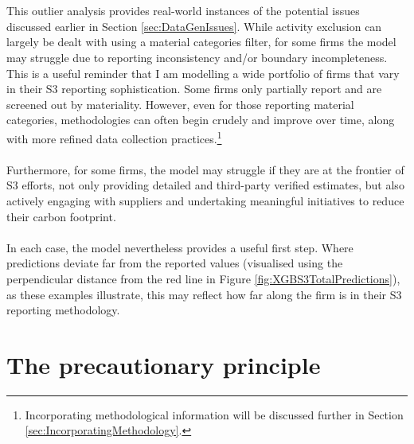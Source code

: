 \documentclass[12pt,twoside]{report}
\begin{document}
\\\\
This outlier analysis provides real-world instances of the potential issues discussed earlier in Section \ref{sec:DataGenIssues}. While activity exclusion can largely be dealt with using a material categories filter, for some firms the model may struggle due to reporting inconsistency and/or boundary incompleteness. This is a useful reminder that I am modelling a wide portfolio of firms that vary in their S3 reporting sophistication. Some firms only partially report and are screened out by materiality. However, even for those reporting material categories, methodologies can often begin crudely and improve over time, along with more refined data collection practices.\footnote{Incorporating methodological information will be discussed further in Section \ref{sec:IncorporatingMethodology}.} 
\\\\
Furthermore, for some firms, the model may struggle if they are at the frontier of S3 efforts, not only providing detailed and third-party verified estimates, but also actively engaging with suppliers and undertaking meaningful initiatives to reduce their carbon footprint. 
\\\\
In each case, the model nevertheless provides a useful first step. Where predictions deviate far from the reported values (visualised using the perpendicular distance from the red line in Figure \ref{fig:XGBS3TotalPredictions}), as these examples illustrate, this may reflect how far along the firm is in their S3 reporting methodology.

\section{The precautionary principle}\label{sec:PrecuationaryPrinciple}
\end{document}
